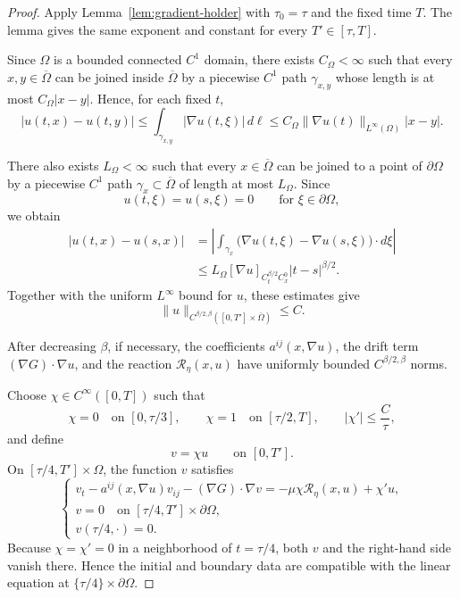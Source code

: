 \documentclass[11pt]{article}
\theoremstyle{remark}
\newcommand{\cT}{\mathcal{R}}
\begin{document}
\begin{proof}
Apply Lemma~\ref{lem:gradient-holder} with $\tau_0=\tau$ and the fixed
time $T$. The lemma gives the same exponent and constant for every
$T'\in[\tau,T]$.

Since $\Omega$ is a bounded connected $C^1$ domain, there exists
$C_\Omega<\infty$ such that every $x,y\in\overline{\Omega}$ can be joined
inside $\overline{\Omega}$ by a piecewise $C^1$ path
$\gamma_{x,y}$ whose length is at most $C_\Omega|x-y|$. Hence, for each
fixed $t$,
\[
|u(t,x)-u(t,y)|
\leq
\int_{\gamma_{x,y}}|\nabla u(t,\xi)|\,d\ell
\leq
C_\Omega
\|\nabla u(t)\|_{L^\infty(\Omega)}
|x-y|.
\]

There also exists $L_\Omega<\infty$ such that every
$x\in\overline{\Omega}$ can be joined to a point of $\partial\Omega$ by
a piecewise $C^1$ path $\gamma_x\subset\overline{\Omega}$ of length at
most $L_\Omega$. Since
\[
u(t,\xi)=u(s,\xi)=0
\qquad
\text{for }\xi\in\partial\Omega,
\]
we obtain
\[
\begin{aligned}
|u(t,x)-u(s,x)|
&=
\left|
\int_{\gamma_x}
\bigl(\nabla u(t,\xi)-\nabla u(s,\xi)\bigr)\cdot d\xi
\right| \\
&\leq
L_\Omega
[\nabla u]_{C_t^{\beta/2}C_x^0}
|t-s|^{\beta/2}.
\end{aligned}
\]
Together with the uniform $L^\infty$ bound for $u$, these estimates give
\[
\|u\|_{C^{\beta/2,\beta}
([0,T']\times\overline{\Omega})}
\leq C.
\]

After decreasing $\beta$, if necessary, the coefficients
$a^{ij}(x,\nabla u)$, the drift term
$(\nabla G)\cdot\nabla u$, and the reaction
$\cT_\eta(x,u)$ have uniformly bounded
$C^{\beta/2,\beta}$ norms.

Choose $\chi\in C^\infty([0,T])$ such that
\[
\chi=0
\quad\text{on }[0,\tau/3],
\qquad
\chi=1
\quad\text{on }[\tau/2,T],
\qquad
|\chi'|\leq \frac{C}{\tau},
\]
and define
\[
v=\chi u
\qquad\text{on }[0,T'].
\]
On $[\tau/4,T']\times\Omega$, the function $v$ satisfies
\[
\begin{cases}
v_t-a^{ij}(x,\nabla u)v_{ij}-(\nabla G)\cdot\nabla v
=
-\mu\chi\cT_\eta(x,u)+\chi'u,
\\[2mm]
v=0
\quad\text{on }[\tau/4,T']\times\partial\Omega,
\\[1mm]
v(\tau/4,\cdot)=0.
\end{cases}
\]
Because $\chi=\chi'=0$ in a neighborhood of $t=\tau/4$, both $v$ and
the right-hand side vanish there. Hence the initial and boundary data are
compatible with the linear equation at
$\{\tau/4\}\times\partial\Omega$.


\end{proof}
\end{document}
